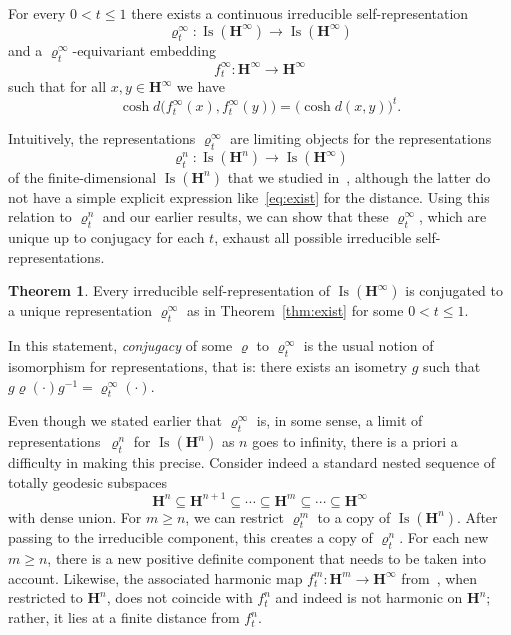 \documentclass[11pt]{article}
\theoremstyle{definition}
\numberwithin{equation}{section}
\numberwithin{figure}{section}
\numberwithin{table}{section}
\newtheorem{imain}{Theorem}
\newenvironment{customthm}[1] {\renewcommand\theinnercustomthm{#1}\innercustomthm} {
\endinnercustomthm}
\newcommand{\HH}{\mathbf{H}}
\newcommand{\HHI}{\mathbf{H}^{\infty}}
\newcommand{\Isomi}{{\Isom}(\HHI)}
\DeclareMathOperator{\Isom}{Is}
\newcommand{\se}{\subseteq}
\newcommand{\inv}{^{-1}}
\newcommand{\ro}{\varrho}
\begin{document}
\begin{customthm}{\ref{thm:Mobnew}\textsuperscript{\textit{bis}}}\label{thm:exist}
For every $0<t\leq 1$ there exists a continuous irreducible self-representation
\[
\ro^\infty_t\colon \Isomi\longrightarrow \Isomi
\]
and a $\ro^\infty_t$-equivariant embedding
\[
f^\infty_t\colon \HHI \longrightarrow \HHI
\]
such that for all $x,y \in \HHI$ we have
\begin{equation}\label{eq:exist}
\cosh d\big(f^\infty_t(x), f^\infty_t(y)\big) = \big(\cosh d(x, y)\big)^t.
\end{equation}
\end{customthm}

Intuitively, the representations $\ro^\infty_t$ are limiting objects for the representations
\[
\ro^n_t\colon \Isom(\HH^n)\longrightarrow \Isomi
\]
of the finite-dimensional $\Isom(\HH^n)$ that we studied in~\cite{Monod-Py}, although the latter do not have a simple explicit expression like~\eqref{eq:exist} for the distance. Using this relation to $\ro^n_t$ and our earlier results, we can show that these $\ro^\infty_t$, which are unique up to conjugacy for each $t$, exhaust all possible irreducible self-representations.

\begin{imain}\label{thm:uniqueness}
Every irreducible self-representation of $\Isomi$ is conjugated to a unique representation $\ro^\infty_t$ as in Theorem~\ref{thm:exist} for some $0<t\leq 1$.
\end{imain}

In this statement, \emph{conjugacy} of some $\ro$ to $\ro^\infty_t$ is the usual notion of isomorphism for representations, that is: there exists an isometry $g$ such that $g\ro(\cdot) g\inv = \ro^\infty_t(\cdot)$.


Even though we stated earlier that $\ro^\infty_t$ is, in some sense, a limit of representations~$\ro^n_t$ for $\Isom(\HH^n)$ as $n$ goes to infinity, there is a priori a difficulty in making this precise. Consider indeed a standard nested sequence of totally geodesic subspaces
\[
\HH^n \se \HH^{n+1} \se \cdots \se \HH^m \se\cdots\se \HHI
\]
with dense union. For $m\ge n$, we can restrict $\ro^m_t$ to a copy of $\Isom(\HH^n)$. After passing to the irreducible component, this creates a copy of $\ro^n_t$. For each new $m\geq n$, there is a new positive definite component that needs to be taken into account. Likewise, the associated harmonic map $f^m_t\colon \HH^m\to\HHI$ from~\cite{Monod-Py}, when restricted to $\HH^n$, does not coincide with $f^n_t$ and indeed is not harmonic on $\HH^n$; rather, it lies at a finite distance from $f^n_t$.
\end{document}
